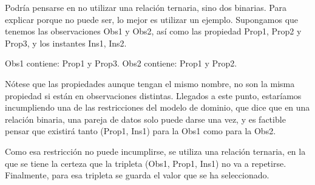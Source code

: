 Podr\'ia pensarse en no utilizar una relaci\'on ternaria, sino dos binarias.
Para explicar porque no puede ser, lo mejor es utilizar un ejemplo. Supongamos que tenemos las
observaciones Obs1 y Obs2, as\'i como las propiedad Prop1, Prop2 y Prop3, y los instantes Ins1, Ins2.

Obs1 contiene: Prop1 y Prop3.
Obs2 contiene: Prop1 y Prop2.

N\'otese que las propiedades aunque tengan el mismo nombre, no son la misma propiedad si est\'an en observaciones distintas.
Llegados a este punto, estar\'iamos incumpliendo una de las restricciones del modelo de dominio, que dice que en una
relaci\'on binaria, una pareja de datos solo puede darse una vez, y es factible pensar que existir\'a tanto
(Prop1, Ins1) para la Obs1 como para la Obs2.

Como esa restricci\'on no puede incumplirse, se utiliza una relaci\'on ternaria, en la que se tiene la certeza
que la tripleta (Obs1, Prop1, Ins1) no va a repetirse. Finalmente, para esa tripleta se guarda el valor que se ha
seleccionado.
